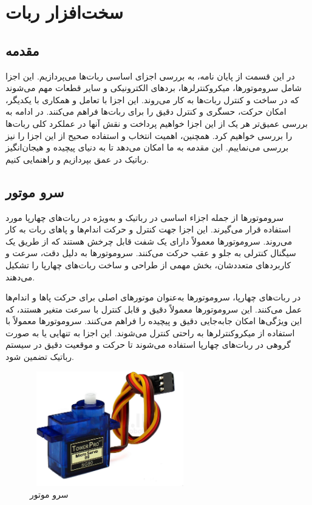 \chapter{سخت‌افزار ربات}
\section{مقدمه}
در این قسمت از پایان نامه، به بررسی اجزای اساسی ربات‌ها می‌پردازیم. این اجزا شامل سروموتورها، میکروکنترلرها، بردهای الکترونیکی و سایر قطعات مهم می‌شوند که در ساخت و کنترل ربات‌ها به کار می‌روند. این اجزا با تعامل و همکاری با یکدیگر، امکان حرکت، حسگری و کنترل دقیق را برای ربات‌ها فراهم می‌کنند. در ادامه به بررسی عمیق‌تر هر یک از این اجزا خواهیم پرداخت و نقش آنها در عملکرد کلی ربات‌ها را بررسی خواهیم کرد. همچنین، اهمیت انتخاب و استفاده صحیح از این اجزا را نیز بررسی می‌نماییم. این مقدمه به ما امکان می‌دهد تا به دنیای پیچیده و هیجان‌انگیز رباتیک در عمق بپردازیم و راهنمایی کنیم. 
\section[سرو موتور]{سرو موتور\cite{Servo}}
سروموتورها از جمله اجزاء اساسی در رباتیک و به‌ویژه در ربات‌های چهارپا مورد استفاده قرار می‌گیرند. این اجزا جهت کنترل و حرکت اندام‌ها و پاهای ربات به کار می‌روند. سروموتورها معمولاً دارای یک شفت قابل چرخش هستند که از طریق یک سیگنال کنترلی به جلو و عقب حرکت می‌کنند. سروموتورها به دلیل دقت، سرعت و کاربرد‌های متعددشان، بخش مهمی از طراحی و ساخت ربات‌های چهارپا را تشکیل می‌دهند.

در ربات‌های چهارپا، سروموتورها به‌عنوان موتورهای اصلی برای حرکت پاها و اندام‌ها عمل می‌کنند. این سروموتورها معمولاً دقیق و قابل کنترل با سرعت متغیر هستند، که این ویژگی‌ها امکان جابه‌جایی دقیق و پیچیده را فراهم می‌کنند. سروموتورها معمولاً با استفاده از میکروکنترلرها به راحتی کنترل می‌شوند. این اجزا به تنهایی یا به صورت گروهی در ربات‌های چهارپا استفاده می‌شوند تا حرکت و موقعیت دقیق در سیستم رباتیک تضمین شود.
 
    \begin{figure}[!h]
	\centering
	\vspace{1cm}
	\includegraphics[height=5cm,width=7cm]{./Images/CH3/Servo.jpg}
	\caption{سرو موتور }
	\label{سرو موتور}
	\end{figure}

